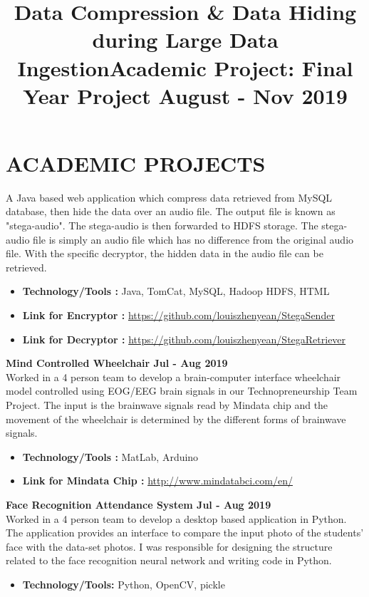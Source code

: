 \section{ACADEMIC PROJECTS}
\title{\textbf{Data Compression \& Data Hiding during Large Data Ingestion}}
\begin{position}
\end{position}
\vspace{-1.2cm}
\title{\textbf{Academic Project: Final Year Project \hfill August - Nov 2019}}
\begin{position}
    A Java based web application which compress data retrieved from MySQL database, then hide the data over an audio file. The output file is known as "stega-audio". The stega-audio is then forwarded to HDFS storage. The stega-audio file is simply an audio file which has no difference from the original audio file. With the specific decryptor, the hidden data in the audio file can be retrieved. \vspace{0.3cm}
    \begin{itemize}
        \item \textbf{Technology/Tools :} Java, TomCat, MySQL, Hadoop HDFS, HTML
        \item \textbf{Link for Encryptor :} \url{https://github.com/louiszhenyean/StegaSender}
        \item \textbf{Link for Decryptor :} \url{https://github.com/louiszhenyean/StegaRetriever}
    \end{itemize}
\end{position}

\textbf{Mind Controlled Wheelchair \hfill Jul - Aug 2019} \\
    Worked in a 4 person team to develop a brain-computer interface wheelchair model controlled using EOG/EEG brain signals in our Technopreneurship Team Project. The input is the brainwave signals read by Mindata chip and the movement of the wheelchair is determined by the different forms of brainwave signals. \vspace{0.2cm}
    \begin{itemize}
        \item \textbf{Technology/Tools :} MatLab, Arduino
        \item \textbf{Link for Mindata Chip :} \url{http://www.mindatabci.com/en/}
    \end{itemize}

\textbf{Face Recognition Attendance System \hfill Jul - Aug 2019} \\
    Worked in a 4 person team to develop a desktop based application in Python. The application provides an interface to compare the input photo of the students' face with the data-set photos. I was responsible for designing the structure related to the face recognition neural network and writing code in Python. \vspace{0.2cm}
    \begin{itemize}
        \item \textbf{Technology/Tools:} Python, OpenCV, pickle
    \end{itemize}

